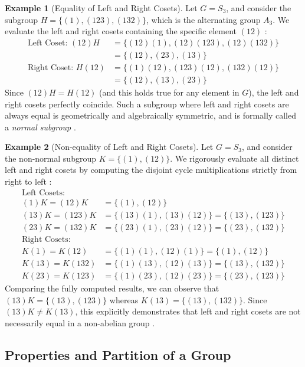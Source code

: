 \documentclass[11pt]{article}
\theoremstyle{definition}
\newtheorem{example}{Example}[section]
\theoremstyle{plain}
\theoremstyle{remark}
\begin{document}
\begin{example}[Equality of Left and Right Cosets]
Let $G = S_3$, and consider the subgroup $H = \{(1), (123), (132)\}$, which is the alternating group $A_3$. We evaluate the left and right cosets containing the specific element $(12)$ \cite{dummit}:
\begin{align}
    \text{Left Coset: } (12)H &= \{(12)(1), (12)(123), (12)(132)\} \\
    &= \{(12), (23), (13)\} \nonumber \\[5pt]
    \text{Right Coset: } H(12) &= \{(1)(12), (123)(12), (132)(12)\} \\
    &= \{(12), (13), (23)\} \nonumber
\end{align}
Since $(12)H = H(12)$ (and this holds true for any element in $G$), the left and right cosets perfectly coincide. Such a subgroup where left and right cosets are always equal is geometrically and algebraically symmetric, and is formally called a \emph{normal subgroup} \cite{gallian}.
\end{example}

\begin{example}[Non-equality of Left and Right Cosets]
Let $G = S_3$, and consider the non-normal subgroup $K = \{(1), (12)\}$. We rigorously evaluate all distinct left and right cosets by computing the disjoint cycle multiplications strictly from right to left \cite{fraleigh}:
\begin{align}
    \text{Left Cosets:} \nonumber \\
    (1)K = (12)K &= \{(1), (12)\} \\
    (13)K = (123)K &= \{(13)(1), (13)(12)\} = \{(13), (123)\} \\
    (23)K = (132)K &= \{(23)(1), (23)(12)\} = \{(23), (132)\} \\[10pt]
    \text{Right Cosets:} \nonumber \\
    K(1) = K(12) &= \{(1)(1), (12)(1)\} = \{(1), (12)\} \\
    K(13) = K(132) &= \{(1)(13), (12)(13)\} = \{(13), (132)\} \\
    K(23) = K(123) &= \{(1)(23), (12)(23)\} = \{(23), (123)\} 
\end{align}
Comparing the fully computed results, we can observe that $(13)K = \{(13), (123)\}$ whereas $K(13) = \{(13), (132)\}$. Since $(13)K \neq K(13)$, this explicitly demonstrates that left and right cosets are not necessarily equal in a non-abelian group \cite{dummit}.
\end{example}
\subsection{Properties and Partition of a Group}
\end{document}
